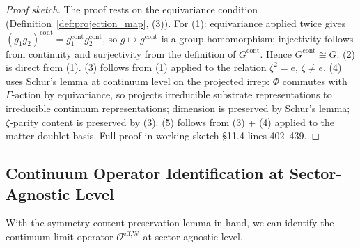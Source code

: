 \documentclass[11pt,letterpaper]{article}
\newcommand{\OeffW}{\mathcal{O}^{\text{eff,W}}}
\begin{document}
\begin{proof}[Proof sketch]
The proof rests on the equivariance condition (Definition~\ref{def:projection_map}, (3)). For (1): equivariance applied twice gives $(g_1 g_2)^{\text{cont}} = g_1^{\text{cont}} g_2^{\text{cont}}$, so $g \mapsto g^{\text{cont}}$ is a group homomorphism; injectivity follows from continuity and surjectivity from the definition of $G^{\text{cont}}$. Hence $G^{\text{cont}} \cong G$. (2) is direct from (1). (3) follows from (1) applied to the relation $\zeta^2 = e$, $\zeta \neq e$. (4) uses Schur's lemma at continuum level on the projected irrep: $\Phi$ commutes with $\Gamma$-action by equivariance, so projects irreducible substrate representations to irreducible continuum representations; dimension is preserved by Schur's lemma; $\zeta$-parity content is preserved by (3). (5) follows from (3) + (4) applied to the matter-doublet basis. Full proof in working sketch \cite{ChiContSketch} §11.4 lines 402--439.
\end{proof}

\subsection{Continuum Operator Identification at Sector-Agnostic Level}
\label{sec:operator_identification}

With the symmetry-content preservation lemma in hand, we can identify the continuum-limit operator $\OeffW$ at sector-agnostic level.
\end{document}
